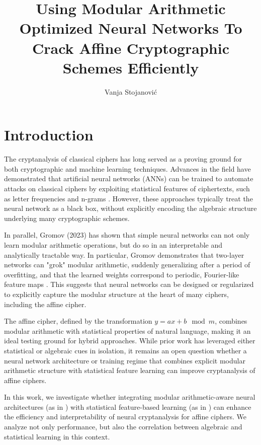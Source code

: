 \documentclass[manuscript,screen,acmtog,natbib=false]{acmart}
\title{Using Modular Arithmetic Optimized Neural Networks To
Crack Affine Cryptographic Schemes Efficiently}
\author{Vanja Stojanović}
\affiliation{
    \institution{University of Ljubljana}
    \department{Faculty of Mathematics and Physics}
    \city{Ljubljana}
    \country{Slovenia}
}
\begin{document}
  \maketitle

  \section{Introduction}
  The cryptanalysis of classical ciphers has long served as a proving ground for both cryptographic
  and machine learning techniques. Advances in the field have demonstrated that artificial neural networks
  (ANNs) can be trained to automate attacks on classical ciphers by exploiting statistical features of
  ciphertexts, such as letter frequencies and n-grams \cite{Focardi2018NeuralCO}. However, these approaches
  typically treat the neural network as a black box, without explicitly encoding the algebraic structure
  underlying many cryptographic schemes.

  In parallel, Gromov (2023) has shown that simple neural networks can not only learn modular arithmetic operations,
  but do so in an interpretable and analytically tractable way. In particular, Gromov demonstrates that two-layer
  networks can "grok" modular arithmetic, suddenly generalizing after a period of overfitting, and that the
  learned weights correspond to periodic, Fourier-like feature maps \cite{gromov2023}. This suggests that neural
  networks can be designed or regularized to explicitly capture the modular structure at the heart of many ciphers,
  including the affine cipher.

  The affine cipher, defined by the transformation \(y = a x + b \mod m\), combines modular arithmetic with statistical
  properties of natural language, making it an ideal testing ground for hybrid approaches. While prior work has leveraged
  either statistical or algebraic cues in isolation, it remains an open question whether a neural network architecture
  or training regime that combines explicit modular arithmetic structure with statistical feature learning can improve
  cryptanalysis of affine ciphers.

  In this work, we investigate whether integrating modular arith\-metic-aware neural architectures (as in \cite{gromov2023})
  with statistical feature-based learning (as in \cite{Focardi2018NeuralCO}) can enhance the efficiency and
  interpretability of neural cryptanalysis for affine ciphers. We analyze not only performance, but also the 
  correlation between algebraic and statistical learning in this context.
  
\end{document}
